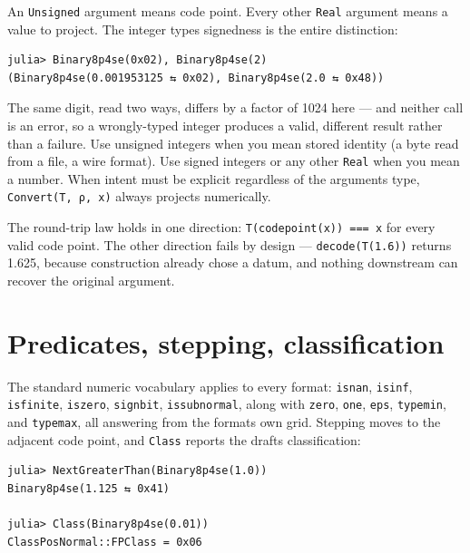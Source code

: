 An \texttt{Unsigned} argument means code point. Every other \texttt{Real} argument means a value to project. The integer type{\textquotesingle}s signedness is the entire distinction:




\nopagebreak[4]
\begin{verbatim}
julia> Binary8p4se(0x02), Binary8p4se(2)
(Binary8p4se(0.001953125 ⇆ 0x02), Binary8p4se(2.0 ⇆ 0x48))
\end{verbatim}



The same digit, read two ways, differs by a factor of 1024 here — and neither call is an error, so a wrongly-typed integer produces a valid, different result rather than a failure. Use unsigned integers when you mean stored identity (a byte read from a file, a wire format). Use signed integers or any other \texttt{Real} when you mean a number. When intent must be explicit regardless of the argument{\textquotesingle}s type, \texttt{Convert(T, ρ, x)} always projects numerically.



The round-trip law holds in one direction: \texttt{T(codepoint(x)) === x} for every valid code point. The other direction fails by design — \texttt{decode(T(1.6))} returns 1.625, because construction already chose a datum, and nothing downstream can recover the original argument.



\section{Predicates, stepping, classification}



\label{16759329318099337913}{}


The standard numeric vocabulary applies to every format: \texttt{isnan}, \texttt{isinf}, \texttt{isfinite}, \texttt{iszero}, \texttt{signbit}, \texttt{issubnormal}, along with \texttt{zero}, \texttt{one}, \texttt{eps}, \texttt{typemin}, and \texttt{typemax}, all answering from the format{\textquotesingle}s own grid. Stepping moves to the adjacent code point, and \texttt{Class} reports the draft{\textquotesingle}s classification:




\nopagebreak[4]
\begin{verbatim}
julia> NextGreaterThan(Binary8p4se(1.0))
Binary8p4se(1.125 ⇆ 0x41)

julia> Class(Binary8p4se(0.01))
ClassPosNormal::FPClass = 0x06
\end{verbatim}



